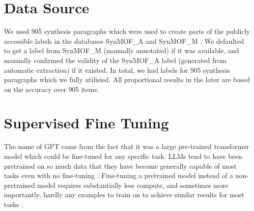 



\section{Data Source}\label{sec:data}
We used 905 synthesis paragraphs which were used to create parts of the publicly accessible labels in the databases SynMOF\_A and SynMOF\_M \cite{luo_mof_2022}.
We defaulted to get a label from SynMOF\_M (manually annotated) if it was available, and manually confirmed the validity of the SynMOF\_A label (generated from automatic extraction) if it existed.
In total, we had labels for 905 synthesis paragraphs which we fully utilisied.
All proportional results in the later  are based on the accuracy over 905 items.

\section{Supervised Fine Tuning}\label{sec:sft}
The name of \acrfull{GPT} came from the fact that it was a large pre-trained transformer model which could be fine-tuned for any specific task.
\glspl{LLM} tend to have been pretrained on so much data that they have become generally capable of most tasks even with no fine-tuning \cite{brown_language_2020}.
Fine-tuning a pretrained model instead of a non-pretrained model requires substantially less compute, and sometimes more importantly, hardly any examples to train on to achieve similar results for most tasks \cite{gaddipati_comparative_2020}.

